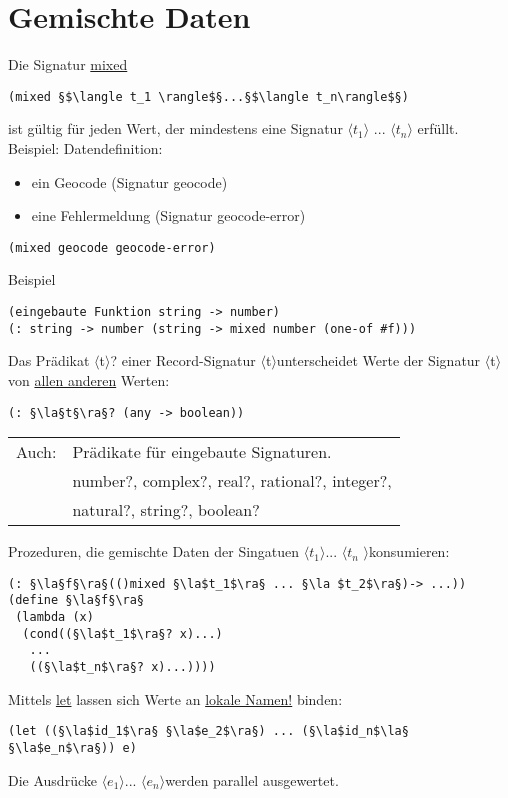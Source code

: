 \documentclass[a4paper,12pt]{article}
\newcommand{\la}{$\langle$}
\newcommand{\ra}{$\rangle$}
\begin{document}
\section{Gemischte Daten}
Die Signatur \uline{mixed}
\begin{lstlisting}[style=customc]
(mixed §$\langle t_1 \rangle$§...§$\langle t_n\rangle$§)
\end{lstlisting}
ist gültig für jeden Wert, der mindestens eine Signatur $\langle t_1 \rangle$ ... $\langle t_n\rangle$ erfüllt.\\
Beispiel: Datendefinition:
\begin{itemize}
\item ein Geocode (Signatur geocode)
\item eine Fehlermeldung (Signatur geocode-error)
\end{itemize}
\begin{lstlisting}[style=customc]
(mixed geocode geocode-error)
\end{lstlisting}
Beispiel \begin{lstlisting}[style=customc]
(eingebaute Funktion string -> number)
(: string -> number (string -> mixed number (one-of #f)))
\end{lstlisting}
Das Prädikat \la t\ra? einer Record-Signatur \la t\ra  unterscheidet Werte der Signatur \la t\ra von \uline{allen anderen} Werten:\\
\begin{lstlisting}[style=customc]
(: §\la§t§\ra§? (any -> boolean))
\end{lstlisting}
\begin{tabular}{ll}
Auch: & Prädikate für eingebaute Signaturen.\\
 & number?, complex?, real?, rational?, integer?,\\ 
 & natural?, string?, boolean?
\end{tabular}
Prozeduren, die gemischte Daten der Singatuen \la $t_1$\ra ... \la $t_n $ \ra konsumieren:
\begin{lstlisting}[style=customc]
(: §\la§f§\ra§(()mixed §\la$t_1$\ra§ ... §\la $t_2$\ra§)-> ...))
(define §\la§f§\ra§
 (lambda (x)
  (cond((§\la$t_1$\ra§? x)...)
   ...
   ((§\la$t_n$\ra§? x)...))))
\end{lstlisting}
Mittels \uline{let} lassen sich Werte an \uline{lokale Namen!} binden:
\begin{lstlisting}[style=customc]
(let ((§\la$id_1$\ra§ §\la$e_2$\ra§) ... (§\la$id_n$\la§ §\la$e_n$\ra§)) e)
\end{lstlisting}
Die Ausdrücke \la $e_1$\ra ... \la$e_n$\ra werden parallel ausgewertet. 
\end{document}
